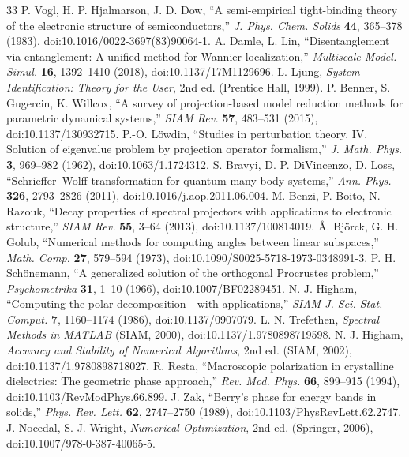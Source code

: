 \documentclass[11pt]{article}
\begin{document}
\begin{thebibliography}{33}
 P. Vogl, H. P. Hjalmarson, J. D. Dow, ``A semi-empirical tight-binding theory of the electronic structure of semiconductors,'' \emph{J. Phys. Chem. Solids} \textbf{44}, 365--378 (1983), doi:10.1016/0022-3697(83)90064-1.
 A. Damle, L. Lin, ``Disentanglement via entanglement: A unified method for Wannier localization,'' \emph{Multiscale Model. Simul.} \textbf{16}, 1392--1410 (2018), doi:10.1137/17M1129696.
 L. Ljung, \emph{System Identification: Theory for the User}, 2nd ed. (Prentice Hall, 1999).
 P. Benner, S. Gugercin, K. Willcox, ``A survey of projection-based model reduction methods for parametric dynamical systems,'' \emph{SIAM Rev.} \textbf{57}, 483--531 (2015), doi:10.1137/130932715.
 P.-O. L\"owdin, ``Studies in perturbation theory. IV. Solution of eigenvalue problem by projection operator formalism,'' \emph{J. Math. Phys.} \textbf{3}, 969--982 (1962), doi:10.1063/1.1724312.
 S. Bravyi, D. P. DiVincenzo, D. Loss, ``Schrieffer--Wolff transformation for quantum many-body systems,'' \emph{Ann. Phys.} \textbf{326}, 2793--2826 (2011), doi:10.1016/j.aop.2011.06.004.
 M. Benzi, P. Boito, N. Razouk, ``Decay properties of spectral projectors with applications to electronic structure,'' \emph{SIAM Rev.} \textbf{55}, 3--64 (2013), doi:10.1137/100814019.
 \AA. Bj\"orck, G. H. Golub, ``Numerical methods for computing angles between linear subspaces,'' \emph{Math. Comp.} \textbf{27}, 579--594 (1973), doi:10.1090/S0025-5718-1973-0348991-3.
 P. H. Sch\"onemann, ``A generalized solution of the orthogonal Procrustes problem,'' \emph{Psychometrika} \textbf{31}, 1--10 (1966), doi:10.1007/BF02289451.
 N. J. Higham, ``Computing the polar decomposition---with applications,'' \emph{SIAM J. Sci. Stat. Comput.} \textbf{7}, 1160--1174 (1986), doi:10.1137/0907079.
 L. N. Trefethen, \emph{Spectral Methods in MATLAB} (SIAM, 2000), doi:10.1137/1.9780898719598.
 N. J. Higham, \emph{Accuracy and Stability of Numerical Algorithms}, 2nd ed. (SIAM, 2002), doi:10.1137/1.9780898718027.
 R. Resta, ``Macroscopic polarization in crystalline dielectrics: The geometric phase approach,'' \emph{Rev. Mod. Phys.} \textbf{66}, 899--915 (1994), doi:10.1103/RevModPhys.66.899.
 J. Zak, ``Berry's phase for energy bands in solids,'' \emph{Phys. Rev. Lett.} \textbf{62}, 2747--2750 (1989), doi:10.1103/PhysRevLett.62.2747.
 J. Nocedal, S. J. Wright, \emph{Numerical Optimization}, 2nd ed. (Springer, 2006), doi:10.1007/978-0-387-40065-5.

\end{thebibliography}
\end{document}

